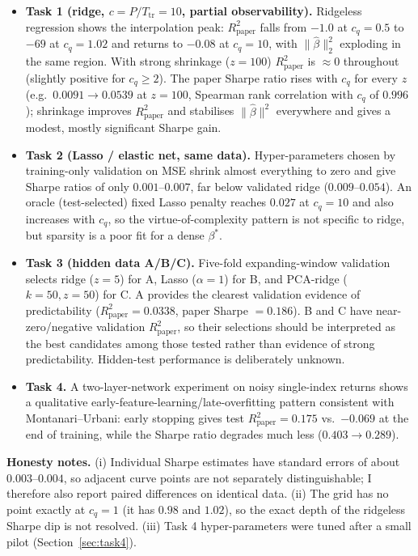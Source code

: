 \documentclass[11pt,a4paper]{article}
\newcommand{\bh}{\widehat{\beta}}
\newcommand{\Rpaper}{R^2_{\mathrm{paper}}}
\newcommand{\Ttr}{T_{\mathrm{tr}}}
\begin{document}
\begin{itemize}
\item \textbf{Task 1 (ridge, $c=P/\Ttr=10$, partial observability).} Ridgeless regression shows the interpolation
peak: $\Rpaper$ falls from $-1.0$ at $c_q=0.5$ to $-69$ at $c_q=1.02$ and returns to $-0.08$ at $c_q=10$, with
$\|\bh\|_2^2$ exploding in the same region. With strong shrinkage ($z=100$) $\Rpaper$ is $\approx 0$ throughout (slightly positive
for $c_q\ge 2$). The paper Sharpe ratio rises with $c_q$ for every $z$ (e.g.\ $0.0091\to0.0539$ at $z=100$, Spearman rank
correlation with $c_q$ of $0.996$); shrinkage improves $\Rpaper$ and stabilises $\|\hat\beta\|^2$ everywhere and gives a modest, mostly significant Sharpe gain.
\item \textbf{Task 2 (Lasso / elastic net, same data).} Hyper-parameters chosen by training-only validation on MSE shrink almost
everything to zero and give Sharpe ratios of only $0.001$--$0.007$, far below validated ridge ($0.009$--$0.054$).
An oracle (test-selected) fixed Lasso penalty reaches $0.027$ at $c_q=10$ and also increases with $c_q$, so the
virtue-of-complexity pattern is not specific to ridge, but sparsity is a poor fit for a dense $\beta^*$.
\item \textbf{Task 3 (hidden data A/B/C).} Five-fold expanding-window validation selects ridge ($z=5$) for A, Lasso ($\alpha=1$) for B, and PCA-ridge ($k=50,z=50$) for C. A provides the clearest validation evidence of predictability ($\Rpaper=0.0338$, paper Sharpe $=0.186$). B and C have near-zero/negative validation $\Rpaper$, so their selections should be interpreted as the best candidates among those tested rather than evidence of strong predictability. Hidden-test performance is deliberately unknown.
\item \textbf{Task 4.} A two-layer-network experiment on noisy single-index returns shows a qualitative early-feature-learning/late-overfitting pattern consistent with Montanari--Urbani: early stopping gives test $\Rpaper=0.175$ vs.\ $-0.069$ at the end of training, while the Sharpe ratio
degrades much less ($0.403\to0.289$).
\end{itemize}

\textbf{Honesty notes.} (i) Individual Sharpe estimates have standard errors of about $0.003$--$0.004$, so adjacent curve points
are not separately distinguishable; I therefore also report paired differences on identical data.
(ii) The grid has no point exactly at $c_q=1$ (it has $0.98$ and $1.02$), so the exact depth of the ridgeless Sharpe dip is not resolved.
(iii) Task 4 hyper-parameters were tuned after a small pilot (Section~\ref{sec:task4}).
\end{document}
